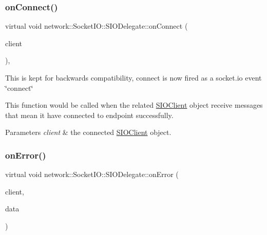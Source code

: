 \subsubsection{\texorpdfstring{on\+Connect()}{onConnect()}\hspace{0.1cm}{\footnotesize\ttfamily [2/2]}}
{\footnotesize\ttfamily virtual void network\+::\+Socket\+I\+O\+::\+S\+I\+O\+Delegate\+::on\+Connect (\begin{DoxyParamCaption}\item[{\hyperlink{classnetwork_1_1SIOClient}{S\+I\+O\+Client} $\ast$}]{client }\end{DoxyParamCaption})\hspace{0.3cm}{\ttfamily [inline]}, {\ttfamily [virtual]}}

This is kept for backwards compatibility, connect is now fired as a socket.\+io event \char`\"{}connect\char`\"{}

This function would be called when the related \hyperlink{classnetwork_1_1SIOClient}{S\+I\+O\+Client} object receive messages that mean it have connected to endpoint successfully.


\begin{DoxyParams}{Parameters}
{\em client} & the connected \hyperlink{classnetwork_1_1SIOClient}{S\+I\+O\+Client} object. \\
\hline
\end{DoxyParams}
\mbox{\label{classnetwork_1_1SocketIO_1_1SIODelegate_a906cad51ad2efe52ffe41047239c6f5d}} 
\subsubsection{\texorpdfstring{on\+Error()}{onError()}\hspace{0.1cm}{\footnotesize\ttfamily [1/2]}}
{\footnotesize\ttfamily virtual void network\+::\+Socket\+I\+O\+::\+S\+I\+O\+Delegate\+::on\+Error (\begin{DoxyParamCaption}\item[{\hyperlink{classnetwork_1_1SIOClient}{S\+I\+O\+Client} $\ast$}]{client,  }\item[{const std\+::string \&}]{data }\end{DoxyParamCaption})\hspace{0.3cm}{\ttfamily [pure virtual]}}

